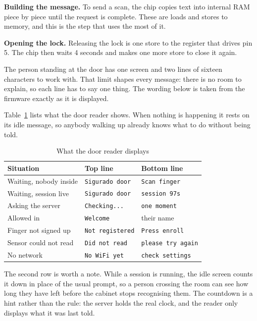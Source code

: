 \textbf{Building the message.} To send a scan, the chip copies text into
internal RAM piece by piece until the request is complete. These are loads and
stores to memory, and this is the step that uses the most of it.

\textbf{Opening the lock.} Releasing the lock is one store to the register that
drives pin 5. The chip then waits 4 seconds and makes one more store to close
it again.


The person standing at the door has one screen and two lines of sixteen
characters to work with. That limit shapes every message: there is no room to
explain, so each line has to say one thing. The wording below is taken from the
firmware exactly as it is displayed.

Table~\ref{tab:lcd-door} lists what the door reader shows. When nothing is
happening it rests on its idle message, so anybody walking up already knows what
to do without being told.

\begin{table}[H]
\centering
\caption{What the door reader displays}
\label{tab:lcd-door}
\linespread{1}\selectfont
\begin{tabular}{@{}p{40mm}p{34mm}p{34mm}@{}}
\toprule
Situation & Top line & Bottom line \\
\midrule
Waiting, nobody inside  & \texttt{Sigurado door}  & \texttt{Scan finger} \\
Waiting, session live   & \texttt{Sigurado door}  & \texttt{session 97s} \\
Asking the server       & \texttt{Checking...}    & \texttt{one moment} \\
Allowed in              & \texttt{Welcome}        & their name \\
Finger not signed up    & \texttt{Not registered} & \texttt{Press enroll} \\
Sensor could not read   & \texttt{Did not read}   & \texttt{please try again} \\
No network              & \texttt{No WiFi yet}    & \texttt{check settings} \\
\bottomrule
\end{tabular}
\end{table}

The second row is worth a note. While a session is running, the idle screen
counts it down in place of the usual prompt, so a person crossing the room can
see how long they have left before the cabinet stops recognising them. The
countdown is a hint rather than the rule: the server holds the real clock, and
the reader only displays what it was last told.


